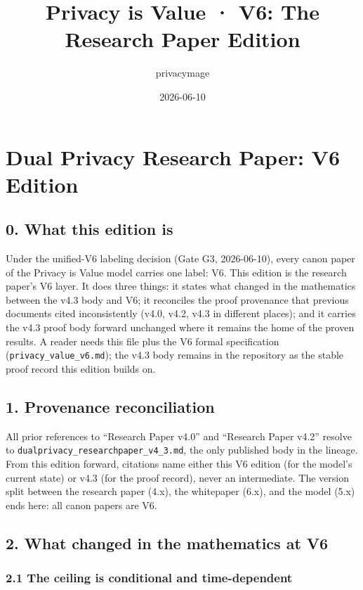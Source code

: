 \documentclass[
  11pt,
]{article}
\title{Privacy is Value · V6: The Research Paper Edition}
\author{privacymage}
\date{2026-06-10}
\begin{document}
\maketitle

\section{Dual Privacy Research Paper: V6
Edition}\label{dual-privacy-research-paper-v6-edition}

\subsection{0. What this edition is}\label{what-this-edition-is}

Under the unified-V6 labeling decision (Gate G3, 2026-06-10), every
canon paper of the Privacy is Value model carries one label: V6. This
edition is the research paper's V6 layer. It does three things: it
states what changed in the mathematics between the v4.3 body and V6; it
reconciles the proof provenance that previous documents cited
inconsistently (v4.0, v4.2, v4.3 in different places); and it carries
the v4.3 proof body forward unchanged where it remains the home of the
proven results. A reader needs this file plus the V6 formal
specification (\texttt{privacy\_value\_v6.md}); the v4.3 body remains in
the repository as the stable proof record this edition builds on.

\subsection{1. Provenance
reconciliation}\label{provenance-reconciliation}

All prior references to ``Research Paper v4.0'' and ``Research Paper
v4.2'' resolve to \texttt{dualprivacy\_researchpaper\_v4\_3.md}, the
only published body in the lineage. From this edition forward, citations
name either this V6 edition (for the model's current state) or v4.3 (for
the proof record), never an intermediate. The version split between the
research paper (4.x), the whitepaper (6.x), and the model (5.x) ends
here: all canon papers are V6.

\subsection{2. What changed in the mathematics at
V6}\label{what-changed-in-the-mathematics-at-v6}

\subsubsection{2.1 The ceiling is conditional and
time-dependent}\label{the-ceiling-is-conditional-and-time-dependent}
\end{document}
